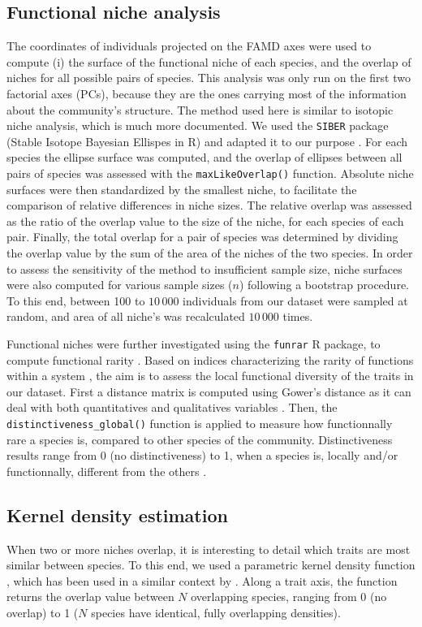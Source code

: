  \subsection{Functional niche analysis}
 The coordinates of individuals projected on the FAMD axes were used to compute (i) the surface of the functional niche of each species, and the overlap of niches for all possible pairs of species. This analysis was only run on the first two factorial axes (PCs), because they are the ones carrying most of the information about the community's structure. The method used here is similar to isotopic niche analysis, which is much more documented. We used the \texttt{SIBER} package (Stable Isotope Bayesian Ellispes in R) and adapted it to our purpose \citep{siber2011}. For each species the ellipse surface was computed, and the overlap of ellipses between all pairs of species was assessed with the \texttt{maxLikeOverlap()} function. Absolute niche surfaces were then standardized by the smallest niche, to facilitate the comparison of relative differences in niche sizes. The relative overlap was assessed as the ratio of the overlap value to the size of the niche, for each species of each pair. Finally, the total overlap for a pair of species was determined by dividing the overlap value by the sum of the area of the niches of the two species. In order to assess the sensitivity of the method to insufficient sample size, niche surfaces were also computed for various sample sizes ($n$) following a bootstrap procedure. To this end, between 100 to $10\,000$ individuals from our dataset were sampled at random, and area of all niche's was recalculated $10\,000$ times.

 Functional niches were further investigated using the \texttt{funrar} R package, to compute functional rarity \citep{matthiasgrenie2017}. Based on indices characterizing the rarity of functions within a system \citep{violle2017}, the aim is to assess the local functional diversity of the traits in our dataset. First a distance matrix is computed using Gower's distance as it can deal with both quantitatives and qualitatives variables \citep{brindamour2016,matthiasgrenie2017}. Then, the \texttt{distinctiveness\_global()} function is applied to measure how functionnally rare a species is, compared to other species of the community. Distinctiveness results range from 0 (no distinctiveness) to 1, when a species is, locally and/or functionnally, different from the others \citep{matthiasgrenie2017}.

 \subsection{Kernel density estimation}
 When two or more niches overlap, it is interesting to detail which traits are most similar between species. To this end, we used a parametric kernel density function \citep{mouillot2005} , which has been used in a similar context by \citet{aneeshkumar2017}. Along a trait axis, the function returns the overlap value between $N$ overlapping species, ranging from 0 (no overlap) to 1 ($N$ species have identical, fully overlapping densities).